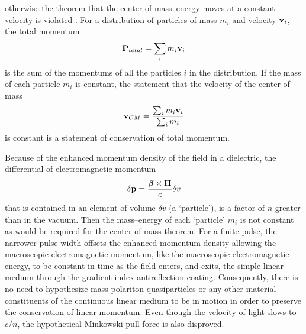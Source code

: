 \documentclass[twocolumn,amssymb,eqsecnum,aps,pra]{revtex4-2}
\begin{document}
otherwise the theorem that the center of mass--energy moves at a
constant velocity is violated \cite{BIBarn}.
For a distribution of particles of mass $m_i$ and velocity ${\bf v}_i$,
the total momentum
\begin{equation}
{\bf P}_{total}= \sum_i m_i {\bf v}_i 
\label{EQq10.05}
\end{equation}
is the sum of the momentums of all the particles $i$ in the
distribution.
If the mass of each particle $m_i$ is constant, the statement that the
velocity of the center of mass
\begin{equation}
{\bf v}_{CM}= \frac{\sum_i m_i {\bf v}_i}{\sum_i m_i}
\label{EQq10.06}
\end{equation}
is constant is a statement of conservation of total momentum.
\par
Because of the enhanced momentum density of the field in a dielectric,
the differential of electromagnetic momentum
\begin{equation}
\delta {\bf p}=\frac{{{\beta}\hskip -5.6pt {\beta}}\times{\bf \Pi}}{c} \delta v
\label{EQq10.07}
\end{equation}
that is contained in an element of volume $\delta v$ (a `particle'),
is a factor of $n$ greater than in the vacuum.
Then the mass--energy of each `particle' $m_i$ is not constant as
would be required for the center-of-mass theorem.
For a finite pulse, the narrower pulse width offsets the enhanced
momentum density allowing the macroscopic electromagnetic
momentum, like the macroscopic electromagnetic energy, to be
constant in time as the field enters, and exits, the simple linear
medium through the gradient-index antireflection coating.
Consequently, there is no need to hypothesize mass-polariton
quasiparticles \cite{BIPart} or any other material constituents of
the continuous linear medium to be in motion in order to preserve
the conservation of linear momentum.
Even though the velocity of light slows to $c/n$, the hypothetical
Minkowski pull-force is also disproved.
\par
\end{document}

